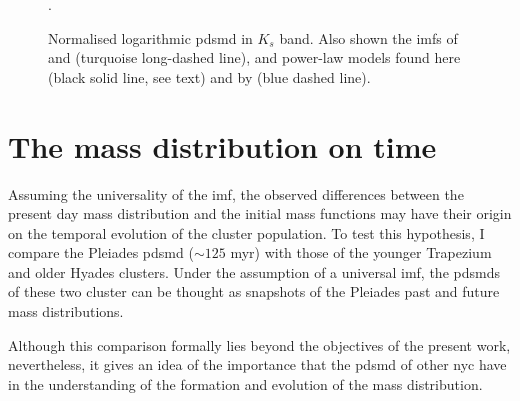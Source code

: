 \begin{figure}[htbp]
\begin{center}
\caption{Normalised logarithmic \gls{pdsmd} in $K_s$ band. Also shown the \glspl{imf} of \citet{Chabrier2005} \cite[blue dotted line with uncertainties from][]{Chabrier2003b} and  \citet{Thies2007} (turquoise long-dashed line), and power-law models found here (black solid line, see text) and by \citet{Bouy2015} (blue dashed line).}
\label{fig:ModelMassFunction}.
\end{center}
\end{figure}

\section{The mass distribution on time}
\label{sect:massontime}
Assuming the universality of the \gls{imf}, the observed differences between the present day mass distribution and the initial mass functions may have their origin on the temporal evolution of the cluster population. To test this hypothesis, I compare the Pleiades \gls{pdsmd} ($\sim125$ \gls{myr}) with those of the younger Trapezium \cite[0.2 to 1.4 \gls{myr}][]{Muench2002} and older Hyades \cite[$648 \pm 45$ \gls{myr}][]{DeGennaro2009} clusters. Under the assumption of a universal \gls{imf}, the \glspl{pdsmd} of these two cluster can be thought as snapshots of the Pleiades past and future mass distributions.

Although this comparison formally lies beyond the objectives of the present work, nevertheless, it gives an idea of the importance that the \gls{pdsmd} of other \gls{nyc} have in the understanding of the formation and evolution of the mass distribution.

